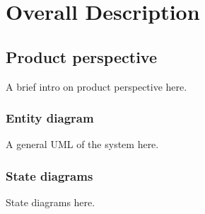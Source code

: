 \section{Overall Description}

\subsection{Product perspective}
A brief intro on product perspective here.

\subsubsection{Entity diagram}
A general UML of the system here.

\subsubsection{State diagrams}
State diagrams here.

